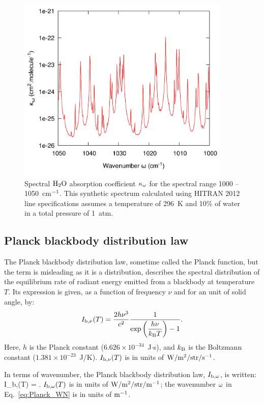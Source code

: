 \begin{figure}
\begin{center}
 \includegraphics[width=4.0in]{Figures/H20_Line_Strength.png}
\end{center}
 \caption{Spectral $\rm H_2O$ absorption coefficient $\kappa_{\omega}$ for the spectral range 1000 -- 1050~cm$^{\rm -1}$. This synthetic spectrum calculated using HITRAN 2012 line specifications assumes a temperature of 296~K and 10\% of water in a total pressure of 1~atm.\label{fig:H2O_Detailed_spectrum}}
\end{figure}

\subsection{Planck blackbody distribution law}

The Planck blackbody distribution law, sometime called the Planck function, but the term is misleading as it is a distribution, describes the spectral distribution of the equilibrium rate of radiant energy emitted from a blackbody at temperature $T$. Its expression is given, as a function of frequency $\nu$ and for an unit of solid angle, by:
\begin{equation}\label{eq:Plank_freqency}
I_{\rm b,\nu}(T) = \displaystyle\frac{2 h\nu^3}{c^2}\displaystyle\frac{1}{\exp\left(\displaystyle\frac{h\nu}{k_{\rm B}T}\right)-1}.
\end{equation}
Here, $h$ is the Planck constant ($6.626 \times 10^{-34}$~J$\cdot$s), and $k_{\rm B}$ is the Boltzmann constant ($1.381 \times 10^{-23}$~J/K). $I_{\rm b,\nu}(T)$ is in units of $\rm{W/m^{2}/str/s^{-1}}$.

In terms of wavenumber, the Planck blackbody distribution law, $I_{\rm b,\omega}$, is written:
\be\label{eq:Planck_WN}
I_{\rm b,\om}(T) =  .
\ee
$I_{\rm b,\omega}(T)$ is in units of $\rm{W/m^2/str/m^{-1}}$; the wavenumber $\omega$ in Eq.~\ref{eq:Planck_WN} is in units of $\rm{m^{-1}}$.

